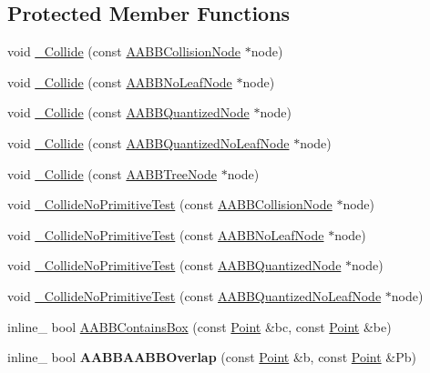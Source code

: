 \subsection*{Protected Member Functions}
\begin{DoxyCompactItemize}
\item 
void \hyperlink{classOpcode_1_1AABBCollider_aa4aa676986ee7f507e957e45f2f5b4ba}{\+\_\+\+Collide} (const \hyperlink{classOpcode_1_1AABBCollisionNode}{A\+A\+B\+B\+Collision\+Node} $\ast$node)
\item 
void \hyperlink{classOpcode_1_1AABBCollider_a7ff71717c0c1ef6d3894fc9ab5e5dcfa}{\+\_\+\+Collide} (const \hyperlink{classOpcode_1_1AABBNoLeafNode}{A\+A\+B\+B\+No\+Leaf\+Node} $\ast$node)
\item 
void \hyperlink{classOpcode_1_1AABBCollider_ae779f38892cb3398c0c1d893f3f6f277}{\+\_\+\+Collide} (const \hyperlink{classOpcode_1_1AABBQuantizedNode}{A\+A\+B\+B\+Quantized\+Node} $\ast$node)
\item 
void \hyperlink{classOpcode_1_1AABBCollider_a9b38f0dda1f0ba7b3225f0f8f2abbf25}{\+\_\+\+Collide} (const \hyperlink{classOpcode_1_1AABBQuantizedNoLeafNode}{A\+A\+B\+B\+Quantized\+No\+Leaf\+Node} $\ast$node)
\item 
void \hyperlink{classOpcode_1_1AABBCollider_ae5e560d946cf02643db63f8856bcb1f9}{\+\_\+\+Collide} (const \hyperlink{classOpcode_1_1AABBTreeNode}{A\+A\+B\+B\+Tree\+Node} $\ast$node)
\item 
void \hyperlink{classOpcode_1_1AABBCollider_aa8eaafb1934f7961ce7caedae4a3142d}{\+\_\+\+Collide\+No\+Primitive\+Test} (const \hyperlink{classOpcode_1_1AABBCollisionNode}{A\+A\+B\+B\+Collision\+Node} $\ast$node)
\item 
void \hyperlink{classOpcode_1_1AABBCollider_a9a23722e23e4d49d248f85daa0482772}{\+\_\+\+Collide\+No\+Primitive\+Test} (const \hyperlink{classOpcode_1_1AABBNoLeafNode}{A\+A\+B\+B\+No\+Leaf\+Node} $\ast$node)
\item 
void \hyperlink{classOpcode_1_1AABBCollider_a700cf755f32326cd8c68c4bbcb3c4b1f}{\+\_\+\+Collide\+No\+Primitive\+Test} (const \hyperlink{classOpcode_1_1AABBQuantizedNode}{A\+A\+B\+B\+Quantized\+Node} $\ast$node)
\item 
void \hyperlink{classOpcode_1_1AABBCollider_a440e56705eec03a65d56a66a44f41bc7}{\+\_\+\+Collide\+No\+Primitive\+Test} (const \hyperlink{classOpcode_1_1AABBQuantizedNoLeafNode}{A\+A\+B\+B\+Quantized\+No\+Leaf\+Node} $\ast$node)
\item 
inline\+\_\+ bool \hyperlink{classOpcode_1_1AABBCollider_abcd553e5b1275abfbad884f11968110a}{A\+A\+B\+B\+Contains\+Box} (const \hyperlink{classOpcode_1_1Point}{Point} \&bc, const \hyperlink{classOpcode_1_1Point}{Point} \&be)
\item 
inline\+\_\+ bool {\bfseries A\+A\+B\+B\+A\+A\+B\+B\+Overlap} (const \hyperlink{classOpcode_1_1Point}{Point} \&b, const \hyperlink{classOpcode_1_1Point}{Point} \&Pb)\hypertarget{classOpcode_1_1AABBCollider_ab70ad121c377c7ca6c1c59c3e5573f61}{}\label{classOpcode_1_1AABBCollider_ab70ad121c377c7ca6c1c59c3e5573f61}


\end{DoxyCompactItemize}
